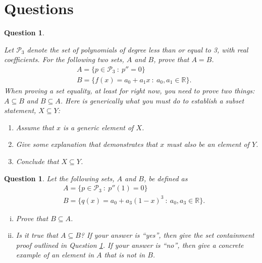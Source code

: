 \documentclass[12pt]{article}
\newtheorem{question}[thm]{Question}
\def\real{{\mathbb R}}
\def\P{\mathcal P}
\begin{document}
\section{Questions}



\begin{question}\label{que:SetEquality}
	\normalfont
	
	Let $\P_3$ denote the set of polynomials of degree less than or equal to 3, with real coefficients. For the following two sets, $A$ and $B$, prove that $A=B$.
	\begin{align*}
		&A = \{ p\in\P_3\ :\ p''=0    \}\\
		&B = \{ f(x)=a_0 + a_1 x\ :\ a_0,a_1\in\real    \}.
	\end{align*}
	When proving a set equality, at least for right now, you need to prove two things: $A\subseteq B$ and $B\subseteq A$.  Here is generically what you must do to establish a subset statement, $X\subseteq Y$:
	\begin{enumerate}
		\item Assume that $x$ is a generic element of $X$.
		\item Give some explanation that demonstrates that $x$ must also be an element of $Y$.
		\item Conclude that $X\subseteq Y$.
	\end{enumerate}
\end{question}

\vspace{0.4cm}

\begin{question}
	\normalfont
	
	
	Let the following sets, $A$ and $B$, be defined as
	\begin{align*}
		&A = \{  p\in\P_3\ :\ p''(1)=0  \}\\
		&B = \{  q(x) = a_0 + a_3(1-x)^3\ :\ a_0,a_3\in\real  \}.
	\end{align*}
	
	
	\begin{enumerate}[(i)]
		\item Prove that $B\subseteq A$.
		\item Is it true that $A\subseteq B$?  If your answer is ``yes'', then give the set containment proof outlined in Question \ref{que:SetEquality}.  If your answer is ``no'', then give a concrete example of an element in $A$ that is not in $B$.
	\end{enumerate}
	
\end{question}
\end{document}
